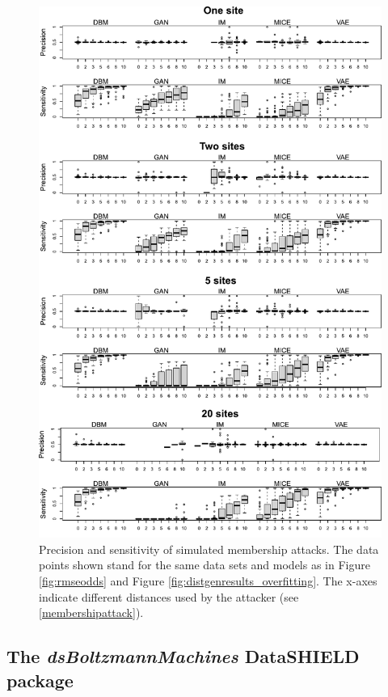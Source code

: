 \documentclass[12pt]{article}
\newcommand{\apkg}[1]{\emph{#1}}
\begin{document}
\begin{figure}[h]
\centering
\includegraphics[scale=0.7]{images/membership_combined.pdf}
\caption{Precision and sensitivity of simulated membership attacks.  The data points shown stand for the same data sets and models as in Figure \ref{fig:rmseodds} and Figure \ref{fig:distgenresults_overfitting}. The x-axes indicate different distances used by the attacker (see \ref{membershipattack}).}
\label{fig:membershipattack}
\end{figure}



\FloatBarrier
\subsection{The \apkg{dsBoltzmannMachines} DataSHIELD package}\label{dsBoltzmannMachinesImpl}
\end{document}
